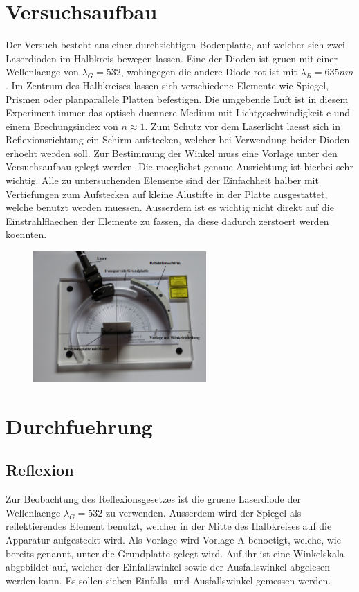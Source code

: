 \section{Versuchsaufbau}
Der Versuch besteht aus einer durchsichtigen Bodenplatte, auf welcher sich zwei Laserdioden im Halbkreis bewegen lassen. Eine der Dioden ist gruen mit einer Wellenlaenge von $\lambda_G=532$, wohingegen die andere Diode rot ist mit $\lambda_R=635nm$. Im Zentrum des Halbkreises lassen sich verschiedene Elemente wie Spiegel, Prismen oder planparallele Platten befestigen. Die umgebende Luft ist in diesem Experiment immer das optisch duennere Medium mit Lichtgeschwindigkeit c und einem Brechungsindex von $n\approx 1$.
Zum Schutz vor dem Laserlicht laesst sich in Reflexionsrichtung ein Schirm aufstecken, welcher bei Verwendung beider Dioden erhoeht werden soll. Zur Bestimmung der Winkel muss eine Vorlage unter den Versuchsaufbau gelegt werden. Die moeglichst genaue Ausrichtung ist hierbei sehr wichtig. Alle zu untersuchenden Elemente sind der Einfachheit halber mit Vertiefungen zum Aufstecken auf kleine Alustifte in der Platte ausgestattet, welche benutzt werden muessen. Ausserdem ist es wichtig nicht direkt auf die Einstrahlflaechen der Elemente zu fassen, da diese dadurch zerstoert werden koennten.
\begin{figure}[H]
    \centering
    \captionsetup{justification=centering}
    \includegraphics[height=5cm]{"Aufbau_Beugung.png"}
    \label{Fig:Aufbau}
\end{figure}
\section{Durchfuehrung}
\subsection{Reflexion}
Zur Beobachtung des Reflexionsgesetzes ist die gruene Laserdiode der Wellenlaenge $\lambda_G=532$ zu verwenden. Ausserdem wird der Spiegel als reflektierendes Element benutzt, welcher in der Mitte des Halbkreises auf die Apparatur aufgesteckt wird. Als Vorlage wird Vorlage A benoetigt, welche, wie bereits genannt, unter die Grundplatte gelegt wird. Auf ihr ist eine Winkelskala abgebildet auf, welcher der Einfallswinkel sowie der Ausfallswinkel abgelesen werden kann. Es sollen sieben Einfalls- und Ausfallswinkel gemessen werden.
